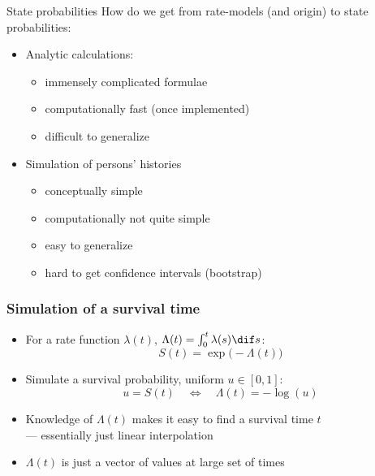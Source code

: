 \begin{frame}{State probabilities}
   How do we get from rate-models (and origin) to state probabilities:
\pause
   \begin{itemize}[<+->]
   \item[1] Analytic calculations:

 \begin{itemize}[<+->]
     \item immensely complicated formulae
     \item computationally fast (once implemented)
     \item difficult to generalize
     \end{itemize}

   \item[2] Simulation of persons' histories

     \begin{itemize}[<+->]
     \item conceptually simple
     \item computationally not quite simple
     \item easy to generalize
     \item hard to get confidence intervals (bootstrap)
     \end{itemize}

   \end{itemize}
\end{frame}

\begin{frame}
   \frametitle{Simulation of a survival time}
   \begin{itemize}[<+->]
   \item For a rate function $\lambda(t)$,
     $\Lambda(t)=\int_0^t\lambda(s) \dif s$:
\[
   S(t) = \exp\bigl( -\Lambda(t) \bigr)
\]
   \item Simulate a survival probability, uniform $u \in [0,1]$:
\[
    u = S(t) \quad \Leftrightarrow \quad \Lambda(t) = -\log(u)
\]
\item Knowledge of $\Lambda(t)$ makes it
      easy to find a survival time $t$\\
      --- essentially just linear interpolation
\item $\Lambda(t)$ is just a vector of values at large set of times
   \end{itemize}
\end{frame}

